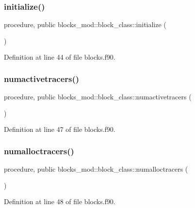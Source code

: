 \subsubsection{\texorpdfstring{initialize()}{initialize()}}
{\footnotesize\ttfamily procedure, public blocks\+\_\+mod\+::block\+\_\+class\+::initialize (\begin{DoxyParamCaption}{ }\end{DoxyParamCaption})}



Definition at line 44 of file blocks.\+f90.

\mbox{\label{structblocks__mod_1_1block__class_a6e9993302da517acd9420dea33de6b43}} 
\subsubsection{\texorpdfstring{numactivetracers()}{numactivetracers()}}
{\footnotesize\ttfamily procedure, public blocks\+\_\+mod\+::block\+\_\+class\+::numactivetracers (\begin{DoxyParamCaption}{ }\end{DoxyParamCaption})}



Definition at line 47 of file blocks.\+f90.

\mbox{\label{structblocks__mod_1_1block__class_a7a3f2eb6823a683a6aaa2159b50ee990}} 
\subsubsection{\texorpdfstring{numalloctracers()}{numalloctracers()}}
{\footnotesize\ttfamily procedure, public blocks\+\_\+mod\+::block\+\_\+class\+::numalloctracers (\begin{DoxyParamCaption}{ }\end{DoxyParamCaption})}



Definition at line 48 of file blocks.\+f90.

